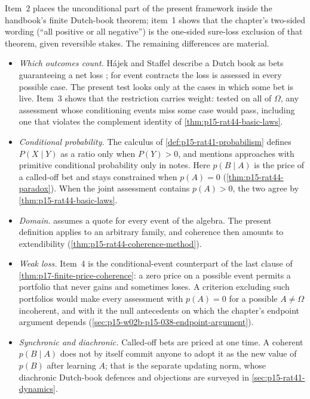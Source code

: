 Item~2 places the unconditional part of the present framework inside
the handbook's finite Dutch-book theorem; item~1 shows that the
chapter's two-sided wording (``all positive or all negative'') is the
one-sided sure-loss exclusion of that theorem, given reversible stakes.
The remaining differences are material.
\begin{itemize}
\item \emph{Which outcomes count.} H\'ajek and Staffel describe a Dutch
      book as bets guaranteeing a net loss
      \cite[p.~240]{HajekStaffel2021Dynamics}; for event contracts the
      loss is assessed in every possible case. The present test looks
      only at the cases in which some bet is live. Item~3 shows that
      the restriction carries weight: tested on all of \(\Omega\), any
      assessment whose conditioning events miss some case would pass,
      including one that violates the complement identity of
      \cref{thm:p15-rat44-basic-laws}.
\item \emph{Conditional probability.} The calculus of
      \cref{def:p15-rat41-probabilism} defines \(P(X\mid Y)\) as a
      ratio only when \(P(Y)>0\), and mentions approaches with primitive
      conditional probability only in notes. Here \(p(B\mid A)\) is the
      price of a called-off bet and stays constrained when \(p(A)=0\)
      (\cref{thm:p15-rat44-paradox}). When the joint assessment
      contains \(p(A)>0\), the two agree by
      \cref{thm:p15-rat44-basic-laws}.
\item \emph{Domain.}  assumes a
      quote for every event of the algebra. The present definition
      applies to an arbitrary family, and coherence then amounts to
      extendibility (\cref{thm:p15-rat44-coherence-method}).
\item \emph{Weak loss.} Item~4 is the conditional-event counterpart of
      the last clause of \cref{thm:p17-finite-price-coherence}: a zero
      price on a possible event permits a portfolio that never gains
      and sometimes loses. A criterion excluding such portfolios would
      make every assessment with \(p(A)=0\) for a possible
      \(A\ne\Omega\) incoherent, and with it the null antecedents on
      which the chapter's endpoint argument depends
      (\cref{sec:p15-w02b-p15-038-endpoint-argument}).
\item \emph{Synchronic and diachronic.} Called-off bets are priced at
      one time. A coherent \(p(B\mid A)\) does not by itself commit
      anyone to adopt it as the new value of \(p(B)\) after learning
      \(A\); that is the separate updating norm, whose diachronic
      Dutch-book defences and objections are surveyed in
      \cref{sec:p15-rat41-dynamics}.
\end{itemize}

